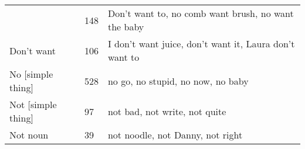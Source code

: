 \documentclass[man]{apa6}
\begin{document}
\begin{longtable}[]{@{}lll@{}}
\begin{minipage}[t]{0.27\columnwidth}
\end{minipage} & \begin{minipage}[t]{0.16\columnwidth}\raggedright\strut
148\strut
\end{minipage} & \begin{minipage}[t]{0.39\columnwidth}\raggedright\strut
Don't want to, no comb want brush, no want the baby\strut
\end{minipage}\tabularnewline
\begin{minipage}[t]{0.27\columnwidth}\raggedright\strut
Don't want\strut
\end{minipage} & \begin{minipage}[t]{0.16\columnwidth}\raggedright\strut
106\strut
\end{minipage} & \begin{minipage}[t]{0.39\columnwidth}\raggedright\strut
I don't want juice, don't want it, Laura don't want to\strut
\end{minipage}\tabularnewline
\begin{minipage}[t]{0.27\columnwidth}\raggedright\strut
No {[}simple thing{]}\strut
\end{minipage} & \begin{minipage}[t]{0.16\columnwidth}\raggedright\strut
528\strut
\end{minipage} & \begin{minipage}[t]{0.39\columnwidth}\raggedright\strut
no go, no stupid, no now, no baby\strut
\end{minipage}\tabularnewline
\begin{minipage}[t]{0.27\columnwidth}\raggedright\strut
Not {[}simple thing{]}\strut
\end{minipage} & \begin{minipage}[t]{0.16\columnwidth}\raggedright\strut
97\strut
\end{minipage} & \begin{minipage}[t]{0.39\columnwidth}\raggedright\strut
not bad, not write, not quite\strut
\end{minipage}\tabularnewline
\begin{minipage}[t]{0.27\columnwidth}\raggedright\strut
Not noun\strut
\end{minipage} & \begin{minipage}[t]{0.16\columnwidth}\raggedright\strut
39\strut
\end{minipage} & \begin{minipage}[t]{0.39\columnwidth}\raggedright\strut
not noodle, not Danny, not right\strut
\end{minipage}\tabularnewline

\end{longtable}
\end{document}
